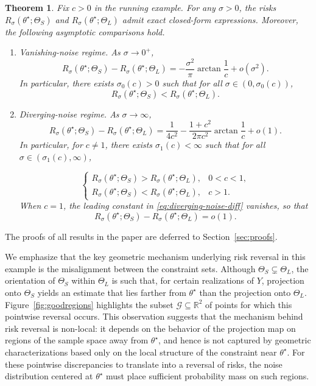 \documentclass[11pt]{article}
\theoremstyle{plain}
\newtheorem{theorem}{Theorem}[section]
\theoremstyle{definition}
\providecommand{\mathbbm}{\mathbb} %
\newcommand{\R}{\mathbbm{R}}
\begin{document}
\begin{theorem}\label{thm:counter-example}
Fix $c > 0$ in the running example. For any $\sigma>0$, the risks $R_\sigma(\theta^\star; \Theta_S)$ and $R_\sigma(\theta^\star; \Theta_L)$ admit exact closed-form expressions. Moreover, the following asymptotic comparisons hold.
\begin{enumerate}
\item[\textup{(i)}] \textit{Vanishing-noise regime.}
As $\sigma\to 0^+$,
\begin{equation}\label{eq:vanishing-noise-diff}
R_\sigma(\theta^\star; \Theta_S) - R_\sigma(\theta^\star; \Theta_L)
=
-\frac{\sigma^2}{\pi}\arctan \frac{1}{c} + o(\sigma^2).
\end{equation}
In particular, there exists $\sigma_0(c) > 0$ such that for all $\sigma\in(0,\sigma_0(c))$,
\[
R_\sigma(\theta^\star; \Theta_S)<R_\sigma(\theta^\star; \Theta_L).
\]

\item[\textup{(ii)}] \textit{Diverging-noise regime.}
As $\sigma\to\infty$,
\begin{equation}\label{eq:diverging-noise-diff}
R_\sigma(\theta^\star; \Theta_S) - R_\sigma(\theta^\star; \Theta_L)
=
\frac{1}{4c^2} - \frac{1+c^2}{2\pi c^2}\arctan \frac{1}{c}
+o(1).
\end{equation}
In particular, for $c\neq 1$, there exists $\sigma_1(c)<\infty$
such that for all $\sigma \in (\sigma_1(c), \infty)$,

\[
\begin{cases}
R_\sigma(\theta^\star; \Theta_S) > R_\sigma(\theta^\star; \Theta_L), & 0 < c < 1,\\[4pt]
R_\sigma(\theta^\star; \Theta_S) < R_\sigma(\theta^\star; \Theta_L), & c > 1.
\end{cases}
\]
When $c=1$, the leading constant in \eqref{eq:diverging-noise-diff} vanishes, so that
\[
R_\sigma(\theta^\star; \Theta_S) - R_\sigma(\theta^\star; \Theta_L)=o(1).
\]
\end{enumerate}
\end{theorem}

The proofs of all results in the paper are deferred to Section~\ref{sec:proofs}.

We emphasize that the key geometric mechanism underlying risk reversal in this example is the misalignment between the constraint sets. Although $\Theta_S \subsetneq \Theta_L$, the orientation of $\Theta_S$ within $\Theta_L$ is such that, for certain realizations of $Y$, projection onto $\Theta_S$ yields an estimate that lies farther from $\theta^\star$ than the projection onto $\Theta_L$. Figure~\ref{fig:goodregions} highlights the subset $\mathcal G \subseteq \R^2$ of points for which this pointwise reversal occurs. This observation suggests that the mechanism behind risk reversal is non-local: it depends on the behavior of the projection map on regions of the sample space away from $\theta^\star$, and hence is not captured by geometric characterizations based only on the local structure of the constraint near $\theta^\star$. For these pointwise discrepancies to translate into a reversal of risks, the noise distribution centered at $\theta^\star$ must place sufficient probability mass on such regions.
\end{document}

